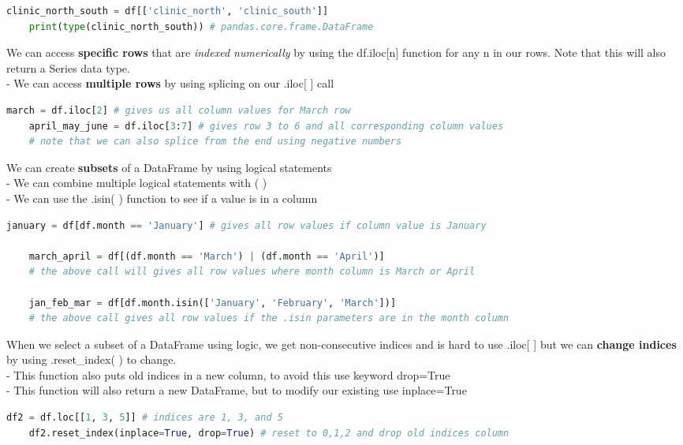 \documentclass[11pt, a4paper]{article}
\begin{document}
\begin{spacing}{1.1}
\begin{lstlisting}[language=Python]
	clinic_north_south = df[['clinic_north', 'clinic_south']]
	print(type(clinic_north_south)) # pandas.core.frame.DataFrame \end{lstlisting}\vspace*{1mm}
	We can access \textbf{specific rows} that are \textit{indexed numerically} by using the df.iloc[n] function for any n in our rows. Note that this will also return a Series data type. \\
	\hspace*{4mm} - We can access \textbf{multiple rows} by using splicing on our .iloc[ ] call 
	\begin{lstlisting}[language=Python]
	march = df.iloc[2] # gives us all column values for March row
	april_may_june = df.iloc[3:7] # gives row 3 to 6 and all corresponding column values
	# note that we can also splice from the end using negative numbers \end{lstlisting}\vspace*{1mm}
	We can create \textbf{subsets} of a DataFrame by using logical statements \\
	\hspace*{4mm} - We can combine multiple logical statements with ( )  \\
	\hspace*{4mm} - We can use the .isin( ) function to see if a value is in a column
	\begin{lstlisting}[language=Python]
	january = df[df.month == 'January'] # gives all row values if column value is January
	
	march_april = df[(df.month == 'March') | (df.month == 'April')]
	# the above call will gives all row values where month column is March or April
	
	jan_feb_mar = df[df.month.isin(['January', 'February', 'March'])]
	# the above call gives all row values if the .isin parameters are in the month column\end{lstlisting}\vspace*{1mm}
	When we select a subset of a DataFrame using logic, we get non-consecutive indices and is hard to use .iloc[ ] but we can \textbf{change indices} by using .reset\_index( ) to change. \\ 
	\hspace*{4mm} - This function also puts old indices in a new column, to avoid this use keyword drop=True \\
	\hspace*{4mm} - This function will also return a new DataFrame, but to modify our existing use inplace=True
	\begin{lstlisting}[language=Python]
	df2 = df.loc[[1, 3, 5]] # indices are 1, 3, and 5
	df2.reset_index(inplace=True, drop=True) # reset to 0,1,2 and drop old indices column\end{lstlisting}\vspace*{4mm}
	

\end{spacing}
\end{document}

